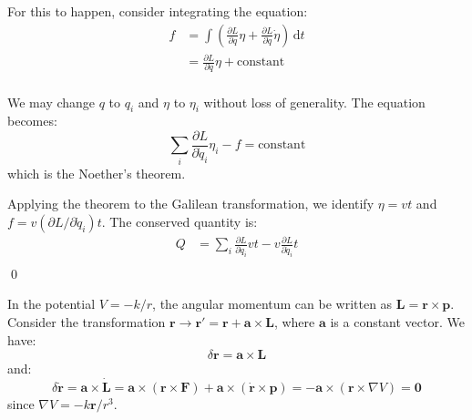 \documentclass[12pt]{article}
\begin{document}
For this to happen, consider integrating the equation:
\begin{equation}
    \begin{split}
        f &= \int \left( \frac{\partial L}{\partial q} \eta + \frac{\partial L}{\partial \dot{q}} \dot{\eta} \right) \, \mathrm{d}t \\
        &= \frac{\partial L}{\partial \dot{q}} \eta + \text{constant} \\
    \end{split}
\end{equation}

We may change $q$ to $q_{i}$ and $\eta$ to $\eta_{i}$ without loss of generality. The equation becomes:
\begin{equation}
    \sum_{i} \frac{\partial L}{\partial \dot{q}_{i}} \eta_{i} - f = \text{constant}
\end{equation}
which is the Noether's theorem.

Applying the theorem to the Galilean transformation, we identify $\eta = vt$ and $f = v (\partial L / \partial \dot{q}_{i}) t$. The conserved quantity is:
\begin{equation}
    \begin{split}
        Q &= \sum_{i} \frac{\partial L}{\partial \dot{q}_{i}} vt - v \frac{\partial L}{\partial \dot{q}_{i}} t \\
    \end{split}
\end{equation}
\qed




In the potential $V = -k/r$, the angular momentum can be written as $\mathbf{L} = \mathbf{r} \times \mathbf{p}$. Consider the transformation $\mathbf{r} \to \mathbf{r}' = \mathbf{r} + \mathbf{a} \times \mathbf{L}$, where $\mathbf{a}$ is a constant vector. We have:
\begin{equation}
    \delta \mathbf{r} = \mathbf{a} \times \mathbf{L}
\end{equation}
and:
\begin{equation}
    \delta \dot{\mathbf{r}} = \mathbf{a} \times \dot{\mathbf{L}} = \mathbf{a} \times (\mathbf{r} \times \mathbf{F}) + \mathbf{a} \times (\dot{\mathbf{r}} \times \mathbf{p}) = -\mathbf{a} \times (\mathbf{r} \times \nabla V) = \mathbf{0}
\end{equation}
since $\nabla V = -k \mathbf{r}/r^{3}$.
\end{document}
